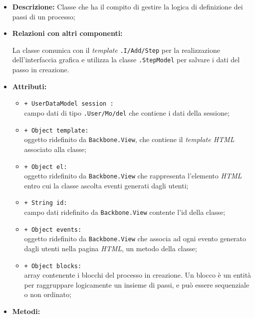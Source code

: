 \begin{flushleft}
\begin{itemize}
\item \textbf{Descrizione:} Classe che ha il compito di gestire la logica di definizione dei passi di un processo;
\item \textbf{Relazioni con altri componenti:}
\begin{sloppypar}
La classe comunica con il \textit{template} \texttt{\viewAdmin{}.I\fshyp{}Add\fshyp{}Step} per la realizzazione dell'interfaccia grafica e utilizza la classe \texttt{\modelUser{}.StepModel} per salvare i dati del passo in creazione.
\end{sloppypar}
\item \textbf{Attributi:}
\begin{sloppypar}
\begin{itemize}
\item \texttt{+ UserDataModel session :}\\ campo dati di tipo \texttt{\model{}.User\fshyp{}Mo\fshyp{}del} che contiene i dati della sessione;
\item \texttt{+ Object template:}\\ oggetto ridefinito da \texttt{Backbone.View}, che contiene il \textit{template HTML} associato alla classe;
\item \texttt{+ Object el:}\\ oggetto ridefinito da \texttt{Backbone.View} che rappresenta l'elemento \textit{HTML} entro cui la classe ascolta eventi generati dagli utenti;
\item \texttt{+ String id:}\\ campo dati ridefinito da \texttt{Backbone.View} contente l'id della classe;
\item \texttt{+ Object events:}\\ oggetto ridefinito da \texttt{Backbone.View} che associa ad ogni evento generato dagli utenti nella pagina \textit{HTML}, un metodo della classe;
\item \texttt{+ Object blocks:}\\ array contenente i blocchi del processo in creazione. Un blocco è un entità per raggruppare logicamente un insieme di passi, e può essere sequenziale o non ordinato;
\end{itemize}
\end{sloppypar}
\item \textbf{Metodi:}
\begin{sloppypar}
\begin{itemize}

\end{itemize}
\end{sloppypar}
\end{itemize}
\end{flushleft}
